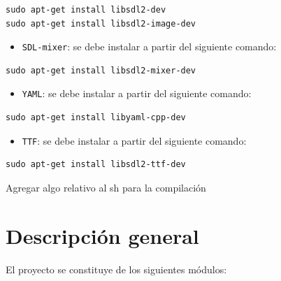 \documentclass[a4paper]{article}
\begin{document}
\begin{verbatim}
sudo apt-get install libsdl2-dev
sudo apt-get install libsdl2-image-dev
\end{verbatim}

\begin{itemize}
	\item \texttt{SDL-mixer}: se debe instalar a partir del siguiente comando:
\end{itemize}

\begin{verbatim}
sudo apt-get install libsdl2-mixer-dev
\end{verbatim}

\begin{itemize}
	\item \texttt{YAML}: se debe instalar a partir del siguiente comando:
\end{itemize}

\begin{verbatim}
sudo apt-get install libyaml-cpp-dev
\end{verbatim}

\begin{itemize}
	\item \texttt{TTF}: se debe instalar a partir del siguiente comando:
\end{itemize}

\begin{verbatim}
sudo apt-get install libsdl2-ttf-dev
\end{verbatim}

Agregar algo relativo al sh para la compilación

\section{Descripción general}

El proyecto se constituye de los siguientes módulos:
\end{document}
